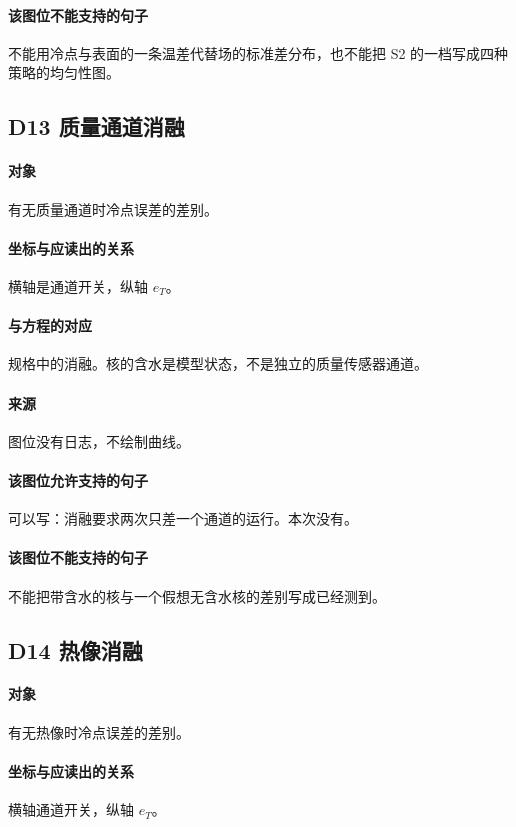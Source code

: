 \paragraph{该图位不能支持的句子}
不能用冷点与表面的一条温差代替场的标准差分布，也不能把 S2 的一档写成四种策略的均匀性图。

\subsection{D13 质量通道消融}
\paragraph{对象}
有无质量通道时冷点误差的差别。

\paragraph{坐标与应读出的关系}
横轴是通道开关，纵轴 $e_T$。

\paragraph{与方程的对应}
规格中的消融。核的含水是模型状态，不是独立的质量传感器通道。

\paragraph{来源}
图位没有日志，不绘制曲线。

\paragraph{该图位允许支持的句子}
可以写：消融要求两次只差一个通道的运行。本次没有。

\paragraph{该图位不能支持的句子}
不能把带含水的核与一个假想无含水核的差别写成已经测到。

\subsection{D14 热像消融}
\paragraph{对象}
有无热像时冷点误差的差别。

\paragraph{坐标与应读出的关系}
横轴通道开关，纵轴 $e_T$。

